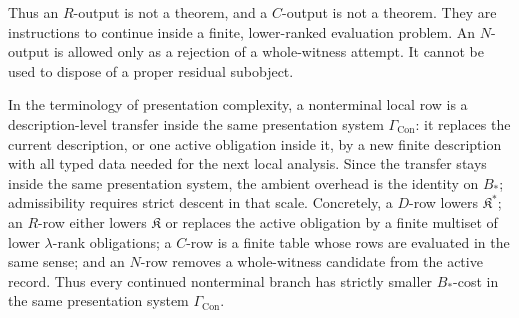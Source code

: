 \documentclass[11pt]{amsart}
\theoremstyle{definition}
\begin{document}
Thus an \(R\)-output is not a theorem, and a \(C\)-output is not a theorem. They are
instructions to continue inside a finite, lower-ranked evaluation problem. An
\(N\)-output is allowed only as a rejection of a whole-witness attempt. It cannot
be used to dispose of a proper residual subobject.

In the terminology of presentation complexity, a nonterminal local row is a
description-level transfer inside the same presentation system
\(\Gamma_{\mathrm{Con}}\): it replaces the current description, or one active
obligation inside it, by a new finite description with all typed data needed for
the next local analysis. Since the transfer stays inside the same presentation system,
the ambient overhead is the identity on \(B_\ast\); admissibility requires strict
descent in that scale. Concretely, a \(D\)-row lowers \(\mathfrak K^\ast\); an
\(R\)-row either lowers \(\mathfrak K\) or replaces the active obligation by a
finite multiset of lower \(\lambda\)-rank obligations; a \(C\)-row is a finite table
whose rows are evaluated in the same sense; and an \(N\)-row removes a
whole-witness candidate from the active record. Thus every continued
nonterminal branch has strictly smaller \(B_\ast\)-cost in the same presentation
system \(\Gamma_{\mathrm{Con}}\).
\end{document}

